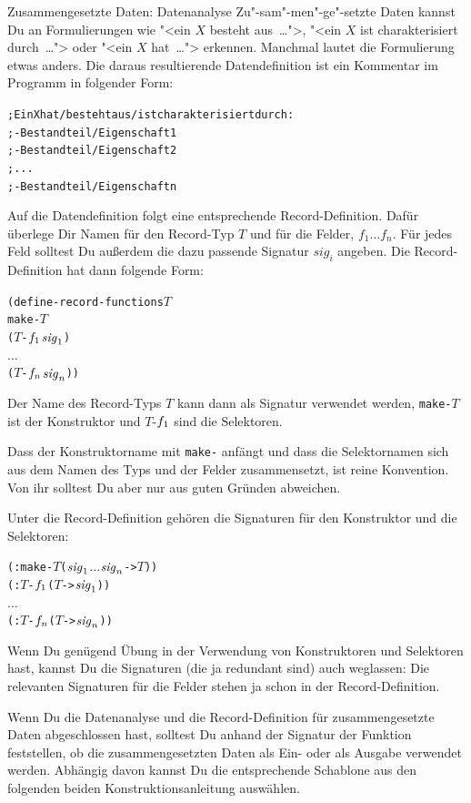 \begin{konstruktionsanleitung}{Zusammengesetzte Daten: Datenanalyse}
  \label{ka:zusammengesetzt-datenanalyse}
Zu"-sam"-men"-ge"-setzte Daten kannst Du an Formulierungen wie "<ein $X$
besteht aus~\ldots">, "<ein $X$ ist charakterisiert durch~\ldots">
oder "<ein $X$ hat~\ldots"> erkennen.  Manchmal lautet die
Formulierung etwas anders.  Die daraus resultierende Datendefinition
ist ein Kommentar im Programm in folgender Form:
%
\begin{alltt}
; Ein X hat / besteht aus / ist charakterisiert durch:
; - Bestandteil / Eigenschaft 1
; - Bestandteil / Eigenschaft 2
; ...
; - Bestandteil / Eigenschaft n
\end{alltt}
%
Auf die Datendefinition folgt eine entsprechende Record-Definition.
Dafür überlege Dir Namen für den Record-Typ $T$ und für die
Felder, $f_1 \ldots f_n$.  Für jedes Feld solltest Du außerdem
die dazu passende Signatur $\mathit{sig}_{i}$ angeben.
Die Record-Definition hat dann folgende
Form:
%
\begin{alltt}
(define-record-functions \(T\)
  make-\(T\)
  (\(T\)-\(f\sb{1}\) \(\mathit{sig}\sb{1}\))
  \(\ldots\)
  (\(T\)-\(f\sb{n}\) \(\mathit{sig}\sb{n}\)))
\end{alltt}
%
Der Name des Record-Typs \(T\) kann dann als Signatur verwendet
werden, \texttt{make-\(T\)} ist der Konstruktor und \(T\)-\(f\sb{1}\)
sind die Selektoren.

Dass der Konstruktorname mit \texttt{make-} anfängt und dass die
Selektornamen sich aus dem Namen des Typs und der Felder
zusammensetzt, ist reine Konvention.  Von ihr solltest Du aber nur aus
guten Gründen abweichen.

Unter die Record-Definition gehören die Signaturen für den Konstruktor
und die Selektoren:
%
\begin{alltt}
(: make-\(T\) (\(\mathit{sig}\sb{1}\) \(\ldots\) \(\mathit{sig}\sb{n}\) -> \(T\)))
(: \(T\)-\(f\sb{1}\) (\(T\) -> \(\mathit{sig}\sb{1}\)))
\(\ldots\)
(: \(T\)-\(f\sb{n}\) (\(T\) -> \(\mathit{sig}\sb{n}\)))
\end{alltt}
%
\end{konstruktionsanleitung}
%
Wenn Du genügend Übung in der Verwendung von Konstruktoren und
Selektoren hast, kannst Du die Signaturen (die ja redundant sind)
auch weglassen: Die relevanten Signaturen für die Felder stehen ja
schon in der Record-Definition.

Wenn Du die Datenanalyse und die Record-Definition für
zusammengesetzte Daten abgeschlossen hast, solltest Du anhand der
Signatur der Funktion feststellen, ob die zusammengesetzten Daten als
Ein- oder als Ausgabe verwendet werden.  Abhängig davon kannst Du die
entsprechende Schablone aus den folgenden beiden
Konstruktionsanleitung auswählen.

